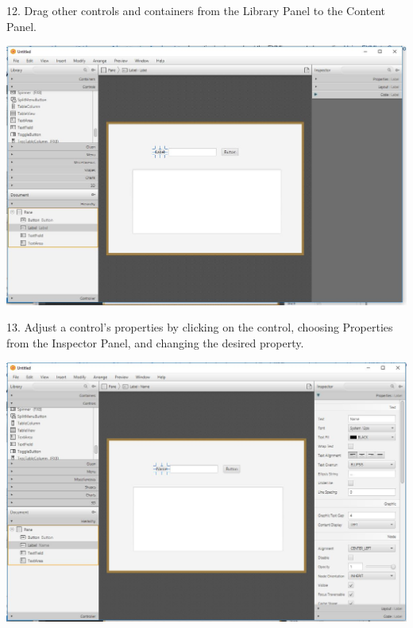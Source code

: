 \documentclass{beamer}
\begin{document}
\begin{frame}
12. Drag other controls and containers from the Library Panel to
the Content Panel.

        \begin{center}
            \includegraphics[scale=.3]{step2.jpg}
        \end{center}
        
\end{frame}

\begin{frame}
13. Adjust a control’s properties by clicking on the control,
choosing Properties from the Inspector Panel, and changing the
desired property.

        \begin{center}
            \includegraphics[scale=.3]{step3.jpg}
        \end{center}
\end{frame}
\end{document}
